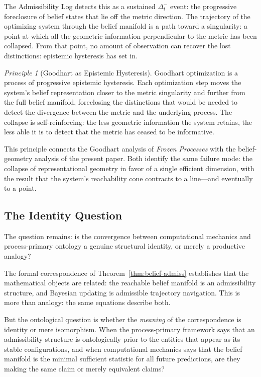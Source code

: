 \documentclass[12pt, a4paper]{article}
\theoremstyle{plain}
\theoremstyle{definition}
\theoremstyle{remark}
\newtheorem{principle}[theorem]{Principle}
\begin{document}
The Admissibility Log detects this as a sustained $\Delta_t^-$ event:
the progressive foreclosure of belief states that lie off the metric
direction. The trajectory of the optimizing system through the belief
manifold is a path toward a singularity: a point at which all the
geometric information perpendicular to the metric has been collapsed.
From that point, no amount of observation can recover the lost distinctions:
epistemic hysteresis has set in.

\begin{principle}[Goodhart as Epistemic Hysteresis]
Goodhart optimization is a process of progressive epistemic hysteresis.
Each optimization step moves the system's belief representation closer
to the metric singularity and further from the full belief manifold,
foreclosing the distinctions that would be needed to detect the
divergence between the metric and the underlying process. The collapse
is self-reinforcing: the less geometric information the system retains,
the less able it is to detect that the metric has ceased to be
informative.
\end{principle}

This principle connects the Goodhart analysis of \emph{Frozen Processes}
with the belief-geometry analysis of the present paper. Both identify
the same failure mode: the collapse of representational geometry in
favor of a single efficient dimension, with the result that the
system's reachability cone contracts to a line---and eventually to
a point.

\subsection{The Identity Question}

The question remains: is the convergence between computational mechanics
and process-primary ontology a genuine structural identity, or merely
a productive analogy?

The formal correspondence of Theorem~\ref{thm:belief-admiss} establishes
that the mathematical objects are related: the reachable belief manifold
is an admissibility structure, and Bayesian updating is admissible
trajectory navigation. This is more than analogy: the same equations
describe both.

But the ontological question is whether the \emph{meaning} of the
correspondence is identity or mere isomorphism. When the process-primary
framework says that an admissibility structure is ontologically prior
to the entities that appear as its stable configurations, and when
computational mechanics says that the belief manifold is the minimal
sufficient statistic for all future predictions, are they making the
same claim or merely equivalent claims?
\end{document}
